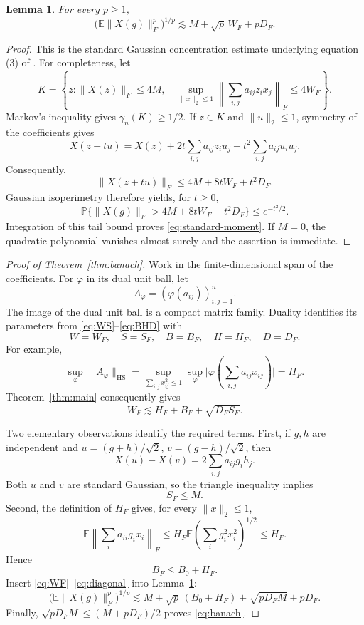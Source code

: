 \documentclass[11pt,a4paper]{article}
\numberwithin{equation}{section}
\newtheorem{lemma}[theorem]{Lemma}
\theoremstyle{remark}
\newcommand{\E}{\mathbb E}
\newcommand{\PP}{\mathbb P}
\newcommand{\norm}[1]{\lVert #1\rVert}
\newcommand{\abs}[1]{\lvert #1\rvert}
\newcommand{\HS}{\mathrm{HS}}
\begin{document}
\begin{lemma}\label{lem:moment}
For every $p\ge1$,
\begin{equation}
 \bigl(\E\norm{X(g)}_F^p\bigr)^{1/p}
 \lesssim M+\sqrt p\,W_F+pD_F.
 \label{eq:standard-moment}
\end{equation}
\end{lemma}

\begin{proof}
This is the standard Gaussian concentration estimate underlying equation (3) of \cite{ALM}. For completeness, let
\[
 K=\left\{z:\norm{X(z)}_F\le4M,\quad
 \sup_{\norm{x}_2\le1}\left\|\sum_{i,j}a_{ij}z_i x_j\right\|_F\le4W_F\right\}.
\]
Markov's inequality gives $\gamma_n(K)\ge1/2$. If $z\in K$ and $\norm{u}_2\le1$, symmetry of the coefficients gives
\[
 X(z+tu)=X(z)+2t\sum_{i,j}a_{ij}z_i u_j
                    +t^2\sum_{i,j}a_{ij}u_i u_j.
\]
Consequently,
\[
 \norm{X(z+tu)}_F\le4M+8tW_F+t^2D_F.
\]
Gaussian isoperimetry therefore yields, for $t\ge0$,
\[
 \PP\{\norm{X(g)}_F>4M+8tW_F+t^2D_F\}\le e^{-t^2/2}.
\]
Integration of this tail bound proves \eqref{eq:standard-moment}. If $M=0$, the quadratic polynomial vanishes almost surely and the assertion is immediate.
\end{proof}

\begin{proof}[Proof of Theorem~\ref{thm:banach}]
Work in the finite-dimensional span of the coefficients. For $\varphi$ in its dual unit ball, let
\[
 A_\varphi=(\varphi(a_{ij}))_{i,j=1}^n.
\]
The image of the dual unit ball is a compact matrix family. Duality identifies its parameters from \eqref{eq:WS}--\eqref{eq:BHD} with
\[
 W=W_F,\quad S=S_F,\quad B=B_F,\quad H=H_F,\quad D=D_F.
\]
For example,
\[
 \sup_\varphi\norm{A_\varphi}_{\HS}
 =\sup_{\sum_{i,j}x_{ij}^2\le1}
   \sup_\varphi\abs{\varphi\!\left(\sum_{i,j}a_{ij}x_{ij}\right)}=H_F.
\]
Theorem~\ref{thm:main} consequently gives
\begin{equation}
 W_F\lesssim H_F+B_F+\sqrt{D_FS_F}.
 \label{eq:WF}
\end{equation}

Two elementary observations identify the required terms. First, if $g,h$ are independent and
$u=(g+h)/\sqrt2$, $v=(g-h)/\sqrt2$, then
\[
 X(u)-X(v)=2\sum_{i,j}a_{ij}g_i h_j.
\]
Both $u$ and $v$ are standard Gaussian, so the triangle inequality implies
\begin{equation}
 S_F\le M.
 \label{eq:SFM}
\end{equation}
Second, the definition of $H_F$ gives, for every $\norm{x}_2\le1$,
\[
 \E\left\|\sum_i a_{ii}g_i x_i\right\|_F
 \le H_F\E\left(\sum_i g_i^2x_i^2\right)^{1/2}
 \le H_F.
\]
Hence
\begin{equation}
 B_F\le B_0+H_F.
 \label{eq:diagonal}
\end{equation}
Insert \eqref{eq:WF}--\eqref{eq:diagonal} into Lemma~\ref{lem:moment}:
\[
 \bigl(\E\norm{X(g)}_F^p\bigr)^{1/p}
 \lesssim M+\sqrt p\,(B_0+H_F)+\sqrt{pD_FM}+pD_F.
\]
Finally, $\sqrt{pD_FM}\le(M+pD_F)/2$ proves \eqref{eq:banach}.
\end{proof}
\end{document}

